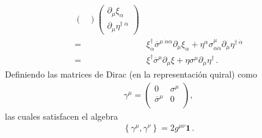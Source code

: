 \begin{frame}
\begin{align}
\begin{pmatrix}
  \end{pmatrix} \begin{pmatrix}
   \partial_{\mu}\xi_{\alpha}\\
   \partial_{\mu}\eta^{\dagger\;\dot{\alpha}}    
  \end{pmatrix}\nonumber\\
=&\xi^{\dagger}_{\dot{\alpha}}\overline{\sigma}^{\mu\;\dot{\alpha}\alpha}\partial_{\mu}\xi_{\alpha}+\eta^{\alpha}\sigma^{\mu}_{\alpha\dot{\alpha}}\partial_{\mu}\eta^{\dagger\;\dot{\alpha}}\nonumber\\
=&\xi^{\dagger}\overline{\sigma}^{\mu}\partial_{\mu}\xi+\eta\sigma^{\mu}\partial_{\mu}\eta^{\dagger}\,.
\end{align}
Definiendo las matrices de Dirac (en la representación quiral) como
\begin{align}
  \gamma^\mu= \begin{pmatrix}
    0           &\sigma^{\mu}\\
    \overline{\sigma}^{\mu} &0\\
  \end{pmatrix},
\end{align}
las cuales satisfacen el algebra
\begin{align}
  \left\{ \gamma^{\mu},\gamma^{\nu} \right\}=2 g^{\mu\nu}\boldsymbol{1}\,.
\end{align}


\end{frame}
